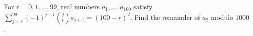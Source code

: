 For $r=0,1,\ldots,99$, real numbers $a_1,\ldots,a_{100}$ satisfy $\sum_{j=r}^{99}(-1)^{j-r}\binom jr a_{j+1}=(100-r)^2$. Find the remainder of $a_2$ modulo $1000$.

